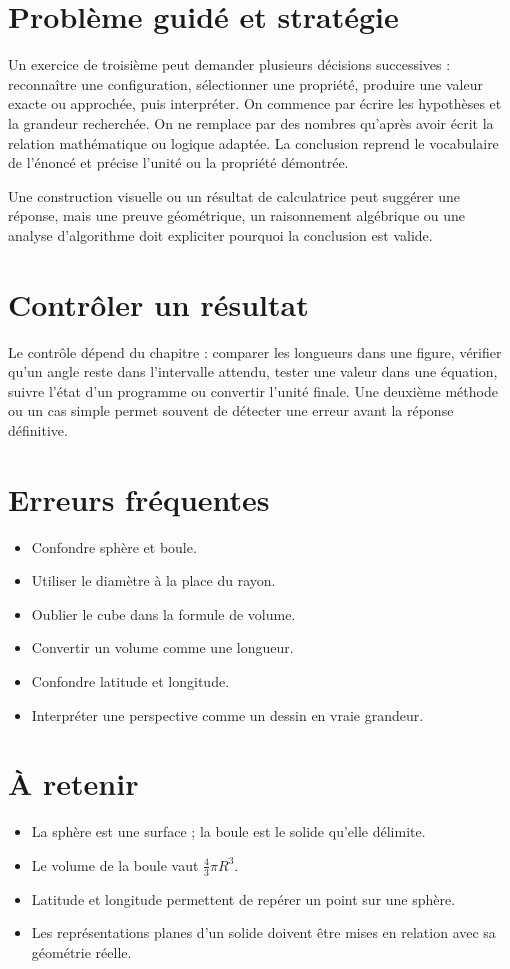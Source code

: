 \section{Problème guidé et stratégie}
Un exercice de troisième peut demander plusieurs décisions successives : reconnaître une configuration, sélectionner une propriété, produire une valeur exacte ou approchée, puis interpréter. On commence par écrire les hypothèses et la grandeur recherchée. On ne remplace par des nombres qu’après avoir écrit la relation mathématique ou logique adaptée. La conclusion reprend le vocabulaire de l’énoncé et précise l’unité ou la propriété démontrée.

\begin{attention}
Une construction visuelle ou un résultat de calculatrice peut suggérer une réponse, mais une preuve géométrique, un raisonnement algébrique ou une analyse d’algorithme doit expliciter pourquoi la conclusion est valide.
\end{attention}

\section{Contrôler un résultat}
Le contrôle dépend du chapitre : comparer les longueurs dans une figure, vérifier qu’un angle reste dans l’intervalle attendu, tester une valeur dans une équation, suivre l’état d’un programme ou convertir l’unité finale. Une deuxième méthode ou un cas simple permet souvent de détecter une erreur avant la réponse définitive.

\section{Erreurs fréquentes}
\begin{itemize}
\item Confondre sphère et boule.
\item Utiliser le diamètre à la place du rayon.
\item Oublier le cube dans la formule de volume.
\item Convertir un volume comme une longueur.
\item Confondre latitude et longitude.
\item Interpréter une perspective comme un dessin en vraie grandeur.
\end{itemize}

\section{À retenir}
\begin{aretenir}
\begin{itemize}
\item La sphère est une surface ; la boule est le solide qu’elle délimite.
\item Le volume de la boule vaut $\frac43\pi R^3$.
\item Latitude et longitude permettent de repérer un point sur une sphère.
\item Les représentations planes d’un solide doivent être mises en relation avec sa géométrie réelle.
\end{itemize}
\end{aretenir}


